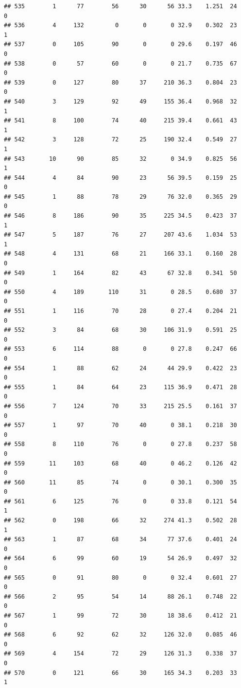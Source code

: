 \documentclass[11pt, a4paper]{article}\usepackage[]{graphicx}\usepackage[]{xcolor}
\makeatletter
\newenvironment{kframe}{%
 \def\at@end@of@kframe{}%
 \ifinner\ifhmode%
  \def\at@end@of@kframe{\end{minipage}}%
  \begin{minipage}{\columnwidth}%
 \fi\fi%
 \def\FrameCommand##1{\hskip\@totalleftmargin \hskip-\fboxsep
 \colorbox{shadecolor}{##1}\hskip-\fboxsep
     \hskip-\linewidth \hskip-\@totalleftmargin \hskip\columnwidth}%
 \MakeFramed {\advance\hsize-\width
   \@totalleftmargin\z@ \linewidth\hsize
   \@setminipage}}%
 {\par\unskip\endMakeFramed%
 \at@end@of@kframe}
\newenvironment{knitrout}{}{} %
\makeatother
\begin{document}
\begin{knitrout}
\begin{kframe}
\begin{verbatim}
## 535        1      77        56      30      56 33.3    1.251  24    0
## 536        4     132         0       0       0 32.9    0.302  23    1
## 537        0     105        90       0       0 29.6    0.197  46    0
## 538        0      57        60       0       0 21.7    0.735  67    0
## 539        0     127        80      37     210 36.3    0.804  23    0
## 540        3     129        92      49     155 36.4    0.968  32    1
## 541        8     100        74      40     215 39.4    0.661  43    1
## 542        3     128        72      25     190 32.4    0.549  27    1
## 543       10      90        85      32       0 34.9    0.825  56    1
## 544        4      84        90      23      56 39.5    0.159  25    0
## 545        1      88        78      29      76 32.0    0.365  29    0
## 546        8     186        90      35     225 34.5    0.423  37    1
## 547        5     187        76      27     207 43.6    1.034  53    1
## 548        4     131        68      21     166 33.1    0.160  28    0
## 549        1     164        82      43      67 32.8    0.341  50    0
## 550        4     189       110      31       0 28.5    0.680  37    0
## 551        1     116        70      28       0 27.4    0.204  21    0
## 552        3      84        68      30     106 31.9    0.591  25    0
## 553        6     114        88       0       0 27.8    0.247  66    0
## 554        1      88        62      24      44 29.9    0.422  23    0
## 555        1      84        64      23     115 36.9    0.471  28    0
## 556        7     124        70      33     215 25.5    0.161  37    0
## 557        1      97        70      40       0 38.1    0.218  30    0
## 558        8     110        76       0       0 27.8    0.237  58    0
## 559       11     103        68      40       0 46.2    0.126  42    0
## 560       11      85        74       0       0 30.1    0.300  35    0
## 561        6     125        76       0       0 33.8    0.121  54    1
## 562        0     198        66      32     274 41.3    0.502  28    1
## 563        1      87        68      34      77 37.6    0.401  24    0
## 564        6      99        60      19      54 26.9    0.497  32    0
## 565        0      91        80       0       0 32.4    0.601  27    0
## 566        2      95        54      14      88 26.1    0.748  22    0
## 567        1      99        72      30      18 38.6    0.412  21    0
## 568        6      92        62      32     126 32.0    0.085  46    0
## 569        4     154        72      29     126 31.3    0.338  37    0
## 570        0     121        66      30     165 34.3    0.203  33    1

\end{verbatim}
\end{kframe}
\end{knitrout}
\end{document}
